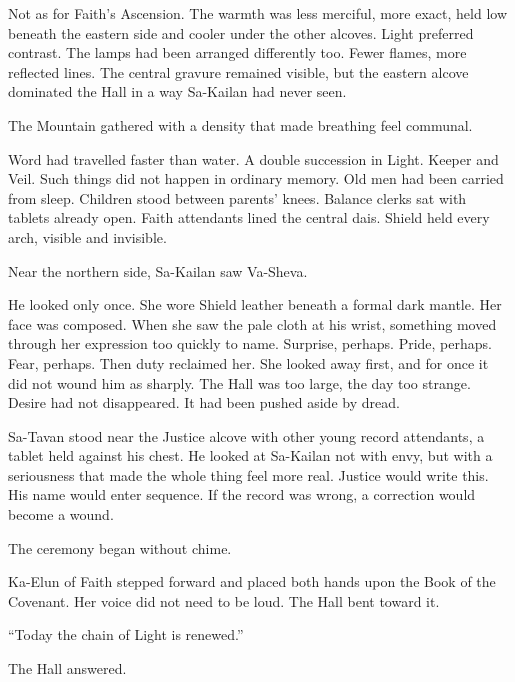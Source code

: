 Not as for Faith’s Ascension. The warmth was less merciful, more exact, held low beneath the eastern side and cooler under the other alcoves. Light preferred contrast. The lamps had been arranged differently too. Fewer flames, more reflected lines. The central gravure remained visible, but the eastern alcove dominated the Hall in a way Sa-Kailan had never seen.\par

The Mountain gathered with a density that made breathing feel communal.\par

Word had travelled faster than water. A double succession in Light. Keeper and Veil. Such things did not happen in ordinary memory. Old men had been carried from sleep. Children stood between parents’ knees. Balance clerks sat with tablets already open. Faith attendants lined the central dais. Shield held every arch, visible and invisible.\par

Near the northern side, Sa-Kailan saw Va-Sheva.\par

He looked only once. She wore Shield leather beneath a formal dark mantle. Her face was composed. When she saw the pale cloth at his wrist, something moved through her expression too quickly to name. Surprise, perhaps. Pride, perhaps. Fear, perhaps. Then duty reclaimed her. She looked away first, and for once it did not wound him as sharply. The Hall was too large, the day too strange. Desire had not disappeared. It had been pushed aside by dread.\par

Sa-Tavan stood near the Justice alcove with other young record attendants, a tablet held against his chest. He looked at Sa-Kailan not with envy, but with a seriousness that made the whole thing feel more real. Justice would write this. His name would enter sequence. If the record was wrong, a correction would become a wound.\par

The ceremony began without chime.\par

Ka-Elun of Faith stepped forward and placed both hands upon the Book of the Covenant. Her voice did not need to be loud. The Hall bent toward it.\par

“Today the chain of Light is renewed.”\par

The Hall answered.\par

